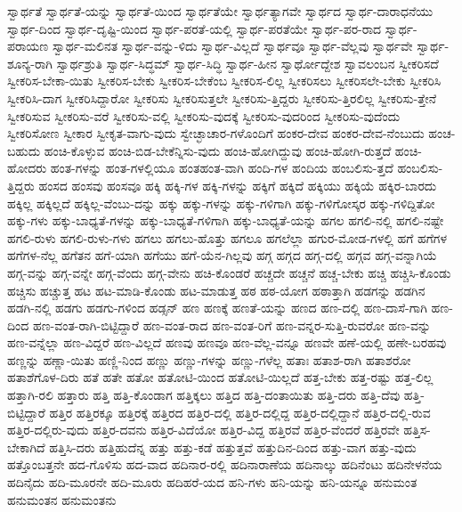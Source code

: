 {ಸ್ವಾರ್ಥತೆ
ಸ್ವಾರ್ಥತೆ-ಯನ್ನು
ಸ್ವಾರ್ಥತೆ-ಯಿಂದ
ಸ್ವಾರ್ಥತೆಯೇ
ಸ್ವಾರ್ಥತ್ಯಾಗವೇ
ಸ್ವಾರ್ಥದ
ಸ್ವಾರ್ಥ-ದಾರಾಧನೆಯು
ಸ್ವಾರ್ಥ-ದಿಂದ
ಸ್ವಾರ್ಥ-ದೃಷ್ಟಿ-ಯಿಂದ
ಸ್ವಾರ್ಥ-ಪರತೆ-ಯಲ್ಲಿ
ಸ್ವಾರ್ಥ-ಪರತೆಯೇ
ಸ್ವಾರ್ಥ-ಪರ-ರಾದ
ಸ್ವಾರ್ಥ-ಪರಾಯಣ
ಸ್ವಾರ್ಥ-ಮಲಿನತ
ಸ್ವಾರ್ಥ-ವನ್ನು-ಳಿದು
ಸ್ವಾರ್ಥ-ವಿಲ್ಲದೆ
ಸ್ವಾರ್ಥವೂ
ಸ್ವಾರ್ಥ-ವೆಲ್ಲವು
ಸ್ವಾರ್ಥವೇ
ಸ್ವಾರ್ಥ-ಶೂನ್ಯ-ರಾಗಿ
ಸ್ವಾರ್ಥಶ್ರುತಿ
ಸ್ವಾರ್ಥ-ಸಿದ್ಧಮ್
ಸ್ವಾರ್ಥ-ಸಿದ್ಧಿ
ಸ್ವಾರ್ಥ-ಹೀನ
ಸ್ವಾರ್ಥೋದ್ದೇಶ
ಸ್ವಾವಲಂಬನ
ಸ್ವೀಕರಿಸದೆ
ಸ್ವೀಕರಿಸ-ಬೇಕಾ-ಯಿತು
ಸ್ವೀಕರಿಸ-ಬೇಕು
ಸ್ವೀಕರಿಸ-ಬೇಕೆಂಬ
ಸ್ವೀಕರಿಸ-ಲಿಲ್ಲ
ಸ್ವೀಕರಿಸಲು
ಸ್ವೀಕರಿಸಲೇ-ಬೇಕು
ಸ್ವೀಕರಿಸಿ
ಸ್ವೀಕರಿಸಿ-ದಾಗ
ಸ್ವೀಕರಿಸಿದ್ದಾರೋ
ಸ್ವೀಕರಿಸು
ಸ್ವೀಕರಿಸುತ್ತಲೇ
ಸ್ವೀಕರಿಸು-ತ್ತಿದ್ದರು
ಸ್ವೀಕರಿಸು-ತ್ತಿರಲಿಲ್ಲ
ಸ್ವೀಕರಿಸು-ತ್ತೇನೆ
ಸ್ವೀಕರಿಸುವ
ಸ್ವೀಕರಿಸು-ವರೆ
ಸ್ವೀಕರಿಸು-ವಲ್ಲಿ
ಸ್ವೀಕರಿಸು-ವುದಕ್ಕೆ
ಸ್ವೀಕರಿಸು-ವುದರಿಂದ
ಸ್ವೀಕರಿಸು-ವುದೆಂದು
ಸ್ವೀಕರಿಸೋಣ
ಸ್ವೀಕಾರ
ಸ್ವೀಕೃತ-ವಾಗು-ವುದು
ಸ್ವೇಚ್ಛಾಚಾರ-ಗಳೊಂದಿಗೆ
ಹಂಕರ-ದೇವ
ಹಂಕರ-ದೇವ-ನೆಂಬುದು
ಹಂಚ-ಬಹುದು
ಹಂಚಿ-ಕೊಳ್ಳುವ
ಹಂಚಿ-ಬಿಡ-ಬೇಕೆನ್ನಿಸು-ವುದು
ಹಂಚಿ-ಹೋಗಿದ್ದುವು
ಹಂಚಿ-ಹೋಗಿ-ರುತ್ತದೆ
ಹಂಚಿ-ಹೋದರು
ಹಂತ-ಗಳನ್ನು
ಹಂತ-ಗಳಲ್ಲಿಯೂ
ಹಂತಹಂತ-ವಾಗಿ
ಹಂದಿ-ಗಳ
ಹಂದಿಯ
ಹಂಬಲಿಸು-ತ್ತದೆ
ಹಂಬಲಿಸು-ತ್ತಿದ್ದರು
ಹಂಸದ
ಹಂಸವು
ಹಂಸವೂ
ಹಕ್ಕಿ
ಹಕ್ಕಿ-ಗಳ
ಹಕ್ಕಿ-ಗಳನ್ನು
ಹಕ್ಕಿಗೆ
ಹಕ್ಕಿದೆ
ಹಕ್ಕಿಯು
ಹಕ್ಕಿಯೆ
ಹಕ್ಕಿರ-ಬಾರದು
ಹಕ್ಕಿಲ್ಲ
ಹಕ್ಕಿಲ್ಲದೆ
ಹಕ್ಕಿಲ್ಲ-ವೆಂಬು-ದನ್ನು
ಹಕ್ಕು
ಹಕ್ಕು-ಗಳನ್ನು
ಹಕ್ಕು-ಗಳಿಗಾಗಿ
ಹಕ್ಕು-ಗಳಿಗೋಸ್ಕರ
ಹಕ್ಕು-ಗಳಿದ್ದಿತೋ
ಹಕ್ಕು-ಗಳು
ಹಕ್ಕು-ಬಾಧ್ಯತೆ-ಗಳನ್ನು
ಹಕ್ಕು-ಬಾಧ್ಯತೆ-ಗಳಿಗಾಗಿ
ಹಕ್ಕು-ಬಾಧ್ಯತೆ-ಯನ್ನು
ಹಗಲ
ಹಗಲಿ-ನಲ್ಲಿ
ಹಗಲಿ-ನಷ್ಟೇ
ಹಗಲಿ-ರುಳು
ಹಗಲಿ-ರುಳು-ಗಳು
ಹಗಲು
ಹಗಲು-ಹೊತ್ತು
ಹಗಲೂ
ಹಗಲೆಲ್ಲಾ
ಹಗುರ-ಮೋಡ-ಗಳಲ್ಲಿ
ಹಗೆ
ಹಗೆಗಳ
ಹಗೆಗಳ-ನೆಲ್ಲ
ಹಗೆತನ
ಹಗೆ-ಯಾಗಿ
ಹಗೆಯು
ಹಗೆ-ಯೆನ-ಗಿಲ್ಲವು
ಹಗ್ಗ
ಹಗ್ಗದ
ಹಗ್ಗ-ದಲ್ಲಿ
ಹಗ್ಗವ
ಹಗ್ಗ-ವನ್ನಾಗಿಯೆ
ಹಗ್ಗ-ವನ್ನು
ಹಗ್ಗ-ವನ್ನೇ
ಹಗ್ಗ-ವೆಂದು
ಹಗ್ಗ-ವೇನು
ಹಚಿ-ಕೊಂಡರೆ
ಹಚ್ಚದೇ
ಹಚ್ಚನೆ
ಹಚ್ಚ-ಬೇಕು
ಹಚ್ಚಿ
ಹಚ್ಚಿಸಿ-ಕೊಂಡು
ಹಚ್ಚಿಸು
ಹಚ್ಚುತ್ತ
ಹಟ
ಹಟ-ಮಾಡಿ-ಕೊಂಡು
ಹಟ-ಮಾಡುತ್ತ
ಹಠ
ಹಠ-ಯೋಗ
ಹಠಾತ್ತಾಗಿ
ಹಡಗನ್ನು
ಹಡಗಿನ
ಹಡಗಿ-ನಲ್ಲಿ
ಹಡಗು
ಹಡಗು-ಗಳಿಂದ
ಹಡ್ಸನ್
ಹಣ
ಹಣಕ್ಕೆ
ಹಣತೆ-ಯನ್ನು
ಹಣದ
ಹಣ-ದಲ್ಲಿ
ಹಣ-ದಾಸೆ-ಗಾಗಿ
ಹಣ-ದಿಂದ
ಹಣ-ವಂತ-ರಾಗಿ-ಬಿಟ್ಟಿದ್ದಾರೆ
ಹಣ-ವಂತ-ರಾದ
ಹಣ-ವಂತ-ರಿಗೆ
ಹಣ-ವನ್ನರ-ಸುತ್ತಿ-ರುವರೋ
ಹಣ-ವನ್ನು
ಹಣ-ವನ್ನೆಲ್ಲಾ
ಹಣ-ವಿದ್ದರೆ
ಹಣ-ವಿಲ್ಲದೆ
ಹಣವು
ಹಣವೂ
ಹಣ-ವೆಲ್ಲ-ವನ್ನೂ
ಹಣವೇ
ಹಣೆ-ಯಲ್ಲಿ
ಹಣೇ-ಬರಹವು
ಹಣ್ಣನ್ನು
ಹಣ್ಣಾ-ಯಿತು
ಹಣ್ಣಿ-ನಿಂದ
ಹಣ್ಣು
ಹಣ್ಣು-ಗಳನ್ನು
ಹಣ್ಣು-ಗಳೆಲ್ಲ
ಹತಾಃ
ಹತಾಶ-ರಾಗಿ
ಹತಾಶರೋ
ಹತಾಶೆಗೊಳ-ದಿರು
ಹತೆ
ಹತೇ
ಹತೋ
ಹತೋಟಿ-ಯಿಂದ
ಹತೋಟಿ-ಯಿಲ್ಲದೆ
ಹತ್ತ-ಬೇಕು
ಹತ್ತ-ರಷ್ಟು
ಹತ್ತ-ಲಿಲ್ಲ
ಹತ್ತಾಗಿ-ರಲಿ
ಹತ್ತಾರು
ಹತ್ತಿ
ಹತ್ತಿ-ಕೊಂಡಾಗ
ಹತ್ತಿಕ್ಕಲು
ಹತ್ತಿದ
ಹತ್ತಿ-ದಂತಾಯಿತು
ಹತ್ತಿ-ದರು
ಹತ್ತಿ-ದೆವು
ಹತ್ತಿ-ಬಿಟ್ಟಿದ್ದಾರೆ
ಹತ್ತಿರ
ಹತ್ತಿರಕ್ಕೂ
ಹತ್ತಿರಕ್ಕೆ
ಹತ್ತಿರದ
ಹತ್ತಿರ-ದಲ್ಲಿ
ಹತ್ತಿರ-ದಲ್ಲಿದ್ದ
ಹತ್ತಿರ-ದಲ್ಲಿದ್ದಾನೆ
ಹತ್ತಿರ-ದಲ್ಲಿ-ರುವ
ಹತ್ತಿರ-ದಲ್ಲಿರು-ವುದು
ಹತ್ತಿರ-ದವನು
ಹತ್ತಿರ-ವಿದೆಯೋ
ಹತ್ತಿರ-ವಿದ್ದ
ಹತ್ತಿರವೆ
ಹತ್ತಿರ-ವೆಂದರೆ
ಹತ್ತಿರವೇ
ಹತ್ತಿಸ-ಬೇಕಾಗಿದೆ
ಹತ್ತಿಸಿ-ದರು
ಹತ್ತಿಹುದೆನ್ನ
ಹತ್ತು
ಹತ್ತು-ಕಡೆ
ಹತ್ತುತ್ತವೆ
ಹತ್ತುದಿನ-ದಿಂದ
ಹತ್ತು-ವಾಗ
ಹತ್ತು-ವುದು
ಹತ್ತೊಂಬತ್ತನೇ
ಹದ-ಗೊಳಿಸು
ಹದ-ವಾದ
ಹದಿನಾರ-ರಲ್ಲಿ
ಹದಿನಾರಾಣೆಯ
ಹದಿನಾಲ್ಕು
ಹದಿನೆಂಟು
ಹದಿನೇಳನೆಯ
ಹದಿನೈದು
ಹದಿ-ಮೂರನೇ
ಹದಿ-ಮೂರು
ಹದಿಹರೆ-ಯದ
ಹನಿ-ಗಳು
ಹನಿ-ಯನ್ನು
ಹನಿ-ಯನ್ನೂ
ಹನುಮಂತ
ಹನುಮಂತನ
ಹನುಮಂತನು
}
